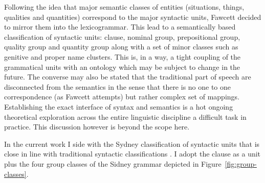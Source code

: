 Following the idea that major semantic classes of entities (situations, things, qualities and quantities) correspond to the major syntactic units, Fawcett decided to mirror them into the lexicogrammar. This lead to a semantically based classification of syntactic units: clause, nominal group, prepositional group, quality group and quantity group \citep[193--194]{Fawcett2000} along with a set of minor classes such as genitive and proper name clusters. This is, in a way, a tight coupling of the grammatical units with an ontology which may be subject to change in the future. The converse may also be stated that the traditional part of speech are disconnected from the semantics in the sense that there is no one to one correspondence (as Fawcett attempts) but rather complex set of mappings. Establishing the exact interface of syntax and semantics is a hot ongoing theoretical exploration across the entire linguistic discipline a difficult task in practice. This discussion however is beyond the scope here.   

In the current work I side with the Sydney classification of syntactic units that is close in line with traditional syntactic classifications \citep{Quirk1985}. I adopt the clause as a unit plus the four group classes of the Sidney grammar depicted in \mbox{Figure \ref{fig:group-classes}}. 

